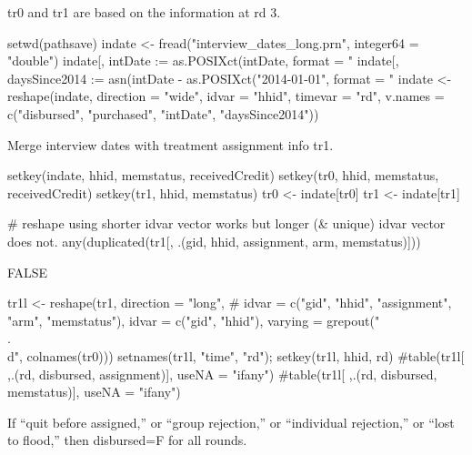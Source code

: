 \textsf{tr0} and \textsf{tr1} are based on the information at rd 3.
\begin{Schunk}
\begin{Sinput}
setwd(pathsave)
indate <- fread("interview_dates_long.prn", integer64 = "double")
indate[, intDate := as.POSIXct(intDate, format = "%Y-%m-%d")]
indate[, daysSince2014 := 
	asn(intDate - as.POSIXct("2014-01-01", format = "%Y-%m-%d"))]
indate <- reshape(indate, direction = "wide", idvar = "hhid",
	timevar = "rd", 
	v.names = c("disbursed", "purchased", "intDate", "daysSince2014"))
\end{Sinput}
\end{Schunk}
Merge interview dates with treatment assignment info \textsf{tr1}.
\begin{Schunk}
\begin{Sinput}
setkey(indate, hhid, memstatus, receivedCredit)
setkey(tr0, hhid, memstatus, receivedCredit)
setkey(tr1, hhid, memstatus)
tr0 <- indate[tr0]
tr1 <- indate[tr1]
\end{Sinput}
\end{Schunk}
\begin{Schunk}
\begin{Sinput}
# reshape using shorter idvar vector works but longer (& unique) idvar vector does not.
any(duplicated(tr1[, .(gid, hhid, assignment, arm, memstatus)]))
\end{Sinput}
\begin{Soutput}
[1] FALSE
\end{Soutput}
\begin{Sinput}
tr1l <- reshape(tr1, direction = "long", 
#	idvar = c("gid", "hhid", "assignment", "arm", "memstatus"), 
	idvar = c("gid", "hhid"), 
	varying = grepout("\\.\\d", colnames(tr0)))
setnames(tr1l, "time", "rd"); setkey(tr1l, hhid, rd)
#table(tr1l[ ,.(rd, disbursed, assignment)], useNA = "ifany")
#table(tr1l[ ,.(rd, disbursed, memstatus)], useNA = "ifany")
\end{Sinput}
\end{Schunk}
If ``quit before assigned,'' or ``group rejection,'' or ``individual rejection,'' or ``lost to flood,'' then \textsf{disbursed}=F for all rounds.

